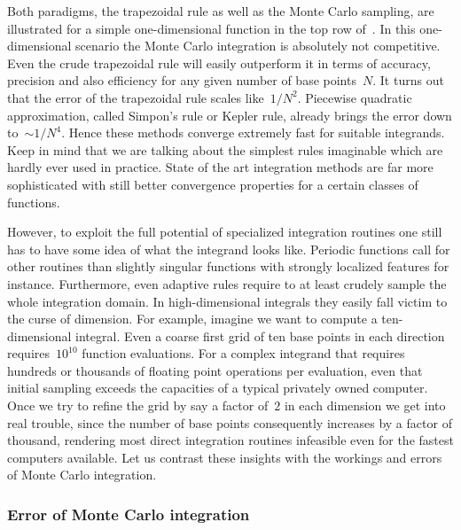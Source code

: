 Both paradigms, the trapezoidal rule as well as the Monte Carlo sampling, are
illustrated for a simple one-dimensional function in the top row
of~. In this one-dimensional scenario the Monte Carlo
integration is absolutely not competitive. Even the crude trapezoidal rule will
easily outperform it in terms of accuracy, precision and also efficiency for any
given number of base points~$N$. It turns out that the error of the trapezoidal
rule scales like~$1/N^2$. Piecewise quadratic approximation, called Simpon's
rule or Kepler rule, already brings the error down to~$\sim 1/N^4$. Hence these
methods converge extremely fast for suitable integrands. Keep in mind that we
are talking about the simplest rules imaginable which are hardly ever used in
practice. State of the art integration methods are far more sophisticated
with still better convergence properties for a certain classes of functions.

However, to exploit the full potential of specialized integration routines one
still has to have some idea of what the integrand looks like. Periodic functions
call for other routines than slightly singular functions with strongly localized
features for instance. Furthermore, even adaptive rules require to at least
crudely sample the whole integration domain. In high-dimensional integrals they
easily fall victim to the curse of dimension. For example, imagine we want to
compute a ten-dimensional integral. Even a coarse first grid of ten base points
in each direction requires~$10^{10}$ function evaluations. For a complex
integrand that requires hundreds or thousands of floating point operations per
evaluation, even that initial sampling exceeds the capacities of a typical
privately owned computer. Once we try to refine the grid by say a factor of~$2$
in each dimension we get into real trouble, since the number of base points
consequently increases by a factor of thousand, rendering most direct
integration routines infeasible even for the fastest computers available. Let us
contrast these insights with the workings and errors of Monte Carlo integration.

\subsubsection{Error of Monte Carlo integration}

